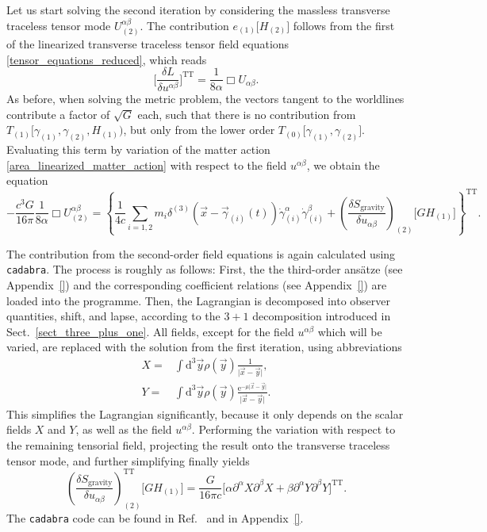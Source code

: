 Let us start solving the second iteration by considering the massless transverse traceless tensor mode $U^{\alpha\beta}_{(2)}$. The contribution $e_{(1)}\lbrack H_{(2)}\rbrack$ follows from the first of the linearized transverse traceless tensor field equations \eqref{tensor_equations_reduced}, which reads
\begin{equation}
  \bigg\lbrack\frac{\delta L}{\delta u^{\alpha\beta}}\bigg\rbrack^\text{TT} = \frac{1}{8\alpha} \Box U_{\alpha\beta}.
\end{equation}
As before, when solving the metric problem, the vectors tangent to the worldlines contribute a factor of $\sqrt{G}$ each, such that there is no contribution from $T_{(1)}\lbrack\gamma_{(1)},\gamma_{(2)},H_{(1)})$, but only from the lower order $T_{(0)}\lbrack\gamma_{(1)},\gamma_{(2)}\rbrack$. Evaluating this term by variation of the matter action \eqref{area_linearized_matter_action} with respect to the field $u^{\alpha\beta}$, we obtain the equation
\begin{equation}\label{area_massless_tt_equation}
  -\frac{c^3G}{16\pi} \frac{1}{8\alpha} \Box U^{\alpha\beta}_{(2)} = \left\{\frac{1}{4c}\sum_{i=1,2} m_i \delta^{(3)}(\vec x-\vec\gamma_{(i)}(t))\dot\gamma^\alpha_{(i)}\dot\gamma^\beta_{(i)} + \left(\frac{\delta S_\text{gravity}}{\delta u_{\alpha\beta}}\right)_{(2)}\lbrack GH_{(1)}\rbrack \right\}^\text{TT}.
\end{equation}

The contribution from the second-order field equations is again calculated using \texttt{cadabra}. The process is roughly as follows: First, the the third-order ansätze (see Appendix~\ref{}) and the corresponding coefficient relations (see Appendix~\ref{}) are loaded into the programme. Then, the Lagrangian is decomposed into observer quantities, shift, and lapse, according to the $3+1$ decomposition introduced in Sect.~\ref{sect_three_plus_one}. All fields, except for the field $u^{\alpha\beta}$ which will be varied, are replaced with the solution from the first iteration, using abbreviations
\begin{equation}
  \begin{aligned}
    X = &{} \int\mathrm d^3\vec y\rho(\vec y)\frac{1}{\lvert\vec x-\vec y\rvert}, \\
    Y = &{} \int\mathrm d^3\vec y\rho(\vec y)\frac{\mathrm e^{-\mu\lvert\vec x-\vec y\rvert}}{\lvert\vec x-\vec y\rvert}.
  \end{aligned}
\end{equation}
This simplifies the Lagrangian significantly, because it only depends on the scalar fields $X$ and $Y$, as well as the field $u^{\alpha\beta}$. Performing the variation with respect to the remaining tensorial field, projecting the result onto the transverse traceless tensor mode, and further simplifying finally yields
\begin{equation}
  \left(\frac{\delta S_\text{gravity}}{\delta u_{\alpha\beta}}\right)^\text{TT}_{(2)}\lbrack GH_{(1)}\rbrack = \frac{G}{16\pi c}\lbrack\alpha\partial^\alpha X\partial^\beta X + \beta\partial^\alpha Y\partial^\beta Y\rbrack^\text{TT}.
\end{equation}
The \texttt{cadabra} code can be found in Ref.\ \cite{Alex_2020_area-metric-gravity} and in Appendix~\ref{}.


